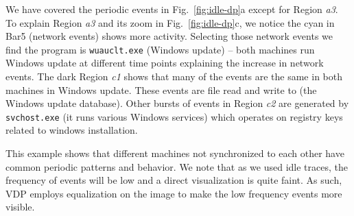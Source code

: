 We have covered the periodic events in Fig.~\ref{fig:idle-dp}a except
for Region {\em a3}.
To explain Region {\em a3} and its zoom in Fig.~\ref{fig:idle-dp}c, 
we notice the cyan in Bar5 (network events) shows more activity.
Selecting those network events we find the
program is {\tt wuauclt.exe} (Windows update) --
both machines run Windows update at different time points explaining
the increase in network events.
The dark Region {\em c1} shows that many of the events are the same 
in both machines in Windows update.
These events are file read and write to
(the Windows update database).
Other bursts of events in Region {\em c2} are generated by
{\tt svchost.exe} (it runs various Windows services) 
which operates on registry keys related to
windows installation.

This example shows that different machines not synchronized to 
each other have common periodic patterns and behavior.
We note that as we used idle traces, the frequency
of events will be low and a direct visualization is quite
faint. As such, VDP employs equalization on the image 
to make the low frequency events more visible.

